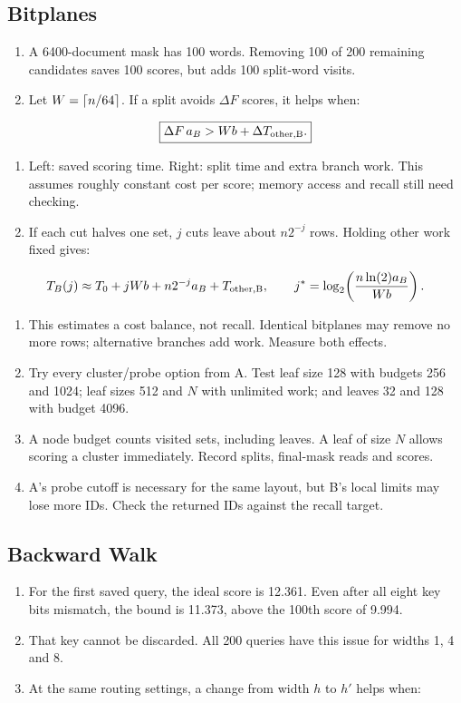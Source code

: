 \newpage
\subsection{Bitplanes}
\begin{enumerate}
\item A 6400-document mask has 100 words. Removing 100 of 200 remaining candidates saves 100 scores, but adds 100 split-word visits.
\item Let $W=\left\lceil n/64\right\rceil$. If a split avoids $\Delta F$ scores, it helps when:
\end{enumerate}

\[
 \boxed{\Delta F\,a_B>Wb+\Delta T_{\rm other,B}.}
\]
\begin{enumerate}[start=3]
\item Left: saved scoring time. Right: split time and extra branch work. This assumes roughly constant cost per score; memory access and recall still need checking.
\item If each cut halves one set, $j$ cuts leave about $n2^{-j}$ rows. Holding other work fixed gives:
\end{enumerate}

\[
 T_B(j)\approx T_0+jWb+n2^{-j}a_B+T_{\rm other,B},\qquad
 j^*=\log_2\!\left(\frac{n\ln(2)a_B}{Wb}\right).
\]
\begin{enumerate}[start=5]
\item This estimates a cost balance, not recall. Identical bitplanes may remove no more rows; alternative branches add work. Measure both effects.
\item Try every cluster/probe option from A. Test leaf size 128 with budgets 256 and 1024; leaf sizes 512 and $N$ with unlimited work; and leaves 32 and 128 with budget 4096.
\item A node budget counts visited sets, including leaves. A leaf of size $N$ allows scoring a cluster immediately. Record splits, final-mask reads and scores.
\item A's probe cutoff is necessary for the same layout, but B's local limits may lose more IDs. Check the returned IDs against the recall target.
\end{enumerate}

\newpage
\subsection{Backward Walk}
\begin{enumerate}
\item For the first saved query, the ideal score is 12.361. Even after all eight key bits mismatch, the bound is 11.373, above the 100th score of 9.994.
\item That key cannot be discarded. All 200 queries have this issue for widths 1, 4 and 8.
\item At the same routing settings, a change from width $h$ to $h'$ helps when:
\end{enumerate}

